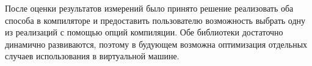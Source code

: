 После оценки результатов измерений было принято решение реализовать оба способа в компиляторе и предоставить пользователю возможность выбрать одну из реализаций с помощью опций компиляции. Обе библиотеки достаточно динамично развиваются, поэтому в будующем возможна оптимизация отдельных случаев использования в виртуальной машине.
